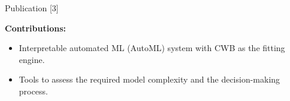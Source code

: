 \documentclass[t,10pt]{beamer}
\begin{document}

\begin{frame}{Publication [3]}
  \vspace{-0.2cm}
  \begin{figure}
    \centering
  \end{figure}
  \vspace{-0.4cm}

  \textbf{Contributions:}
  \begin{itemize}
    \item
      Interpretable automated ML (AutoML) system with CWB as the fitting engine.
    \item
      Tools to assess the required model complexity and the decision-making process.
  \end{itemize}
\end{frame}
\end{document}
